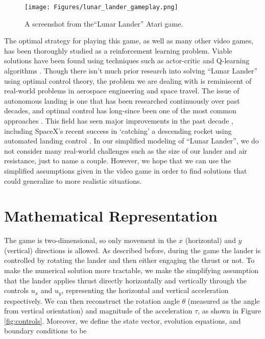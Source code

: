 \documentclass{article}
\begin{document}
\begin{figure}[h]
    \centering
    \texttt{[image: Figures/lunar\_lander\_gameplay.png]}
    \caption{A screenshot from the``Lunar Lander'' Atari game. \cite{LunarLander}}
    \label{fig:gameplay}
\end{figure}

The optimal strategy for playing this game, as well as many other video games, has been thoroughly studied as a reinforcement learning problem. Viable solutions have been found using techniques such as actor-critic \cite{medium_RL} and Q-learning algorithms \cite{atari_RL}. Though there isn't much prior research into solving ``Lunar Lander'' using optimal control theory, the problem we are dealing with is reminiscent of real-world problems in aerospace engineering and space travel. The issue of autonomous landing is one that has been researched continuously over past decades, and optimal control has long-since been one of the most common approaches \cite{pinpoint_landing,nasa}. This field has seen major improvements in the past decade , including SpaceX's recent success in `catching' a descending rocket using automated landing control \cite{spacex}. In our simplified modeling of ``Lunar Lander'', we do not consider many real-world challenges such as the size of our lander and air resistance, just to name a couple. However, we hope that we can use the simplified assumptions given in the video game in order to find solutions that could generalize to more realistic situations.


\section{Mathematical Representation}
\label{sec:Math-Representation}
The game is two-dimensional, so only movement in the $x$ (horizontal) and $y$ (vertical) directions is allowed. As described before, during the game the lander is controlled by rotating the lander and then either engaging the thrust or not. To make the numerical solution more tractable, we make the simplifying assumption that the lander applies thrust directly horizontally and vertically through the controls $u_x$ and $u_y$, representing the horizontal and vertical acceleration respectively. We can then reconstruct the rotation angle $\theta$ (measured as the angle from vertical orientation) and magnitude of the acceleration $\tau$, as shown in Figure \ref{fig:controls}. Moreover, we define the state vector, evolution equations, and boundary conditions to be
\end{document}
